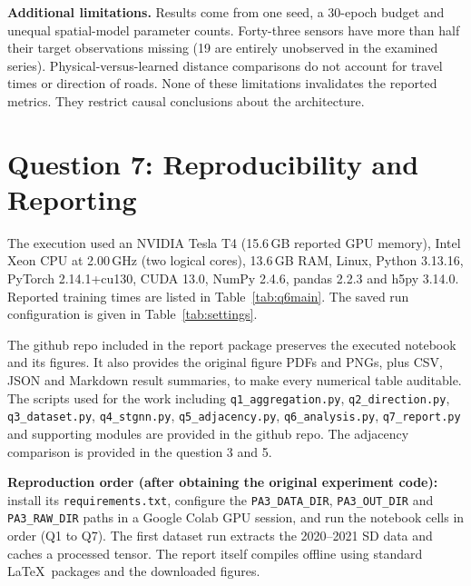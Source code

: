 \documentclass[11pt,a4paper]{article}
\begin{document}
\textbf{Additional limitations.} Results come from one seed, a 30-epoch budget and unequal spatial-model parameter counts. Forty-three sensors have more than half their target observations missing (19 are entirely unobserved in the examined series). Physical-versus-learned distance comparisons do not account for travel times or direction of roads. None of these limitations invalidates the reported metrics. They restrict causal conclusions about the architecture.

\section{Question 7: Reproducibility and Reporting}
The execution used an NVIDIA Tesla T4 (15.6\,GB reported GPU memory), Intel Xeon CPU at 2.00\,GHz (two logical cores), 13.6\,GB RAM, Linux, Python 3.13.16, PyTorch 2.14.1+cu130, CUDA 13.0, NumPy 2.4.6, pandas 2.2.3 and h5py 3.14.0. Reported training times are listed in Table~\ref{tab:q6main}. The saved run configuration is given in Table~\ref{tab:settings}.


The github repo included in the report package preserves the executed notebook and its figures. It also provides the original figure PDFs and PNGs, plus CSV, JSON and Markdown result summaries, to make every numerical table auditable. The scripts used for the work including \texttt{q1\_aggregation.py}, \texttt{q2\_direction.py}, \texttt{q3\_dataset.py}, \texttt{q4\_stgnn.py}, \texttt{q5\_adjacency.py}, \texttt{q6\_analysis.py}, \texttt{q7\_report.py} and supporting modules are provided in the github repo. The adjacency comparison is provided in the question 3 and 5.   

\textbf{Reproduction order (after obtaining the original experiment code):} install its \texttt{requirements.txt}, configure the \texttt{PA3\_DATA\_DIR}, \texttt{PA3\_OUT\_DIR} and \texttt{PA3\_RAW\_DIR} paths in a Google Colab GPU session, and run the notebook cells in order (Q1 to Q7). The first dataset run extracts the 2020--2021 SD data and caches a processed tensor. The report itself compiles offline using standard \LaTeX\ packages and the downloaded figures.
\end{document}
